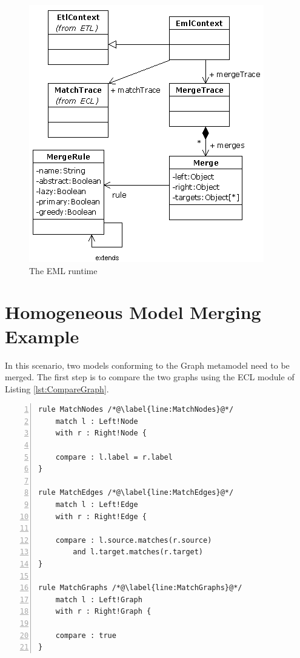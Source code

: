 \begin{figure}
	\centering
		\includegraphics{images/EmlRuntime.png}
	\caption{The EML runtime}
	\label{fig:EmlRuntime}
\end{figure}

\section{Homogeneous Model Merging Example}

In this scenario, two models conforming to the Graph metamodel need to be merged. The first step is to compare the two graphs using the ECL module of Listing \ref{lst:CompareGraph}.

\begin{lstlisting}[basicstyle=\ttfamily\footnotesize, flexiblecolumns=true, numbers=left, nolol=true, caption=ECL module for comparing two instances of the Graph metamodel, label=lst:CompareGraph, language=ECL, tabsize=2]
rule MatchNodes /*@\label{line:MatchNodes}@*/
	match l : Left!Node
	with r : Right!Node {

	compare : l.label = r.label
}

rule MatchEdges /*@\label{line:MatchEdges}@*/
	match l : Left!Edge
	with r : Right!Edge {

	compare : l.source.matches(r.source)
		and l.target.matches(r.target)
}

rule MatchGraphs /*@\label{line:MatchGraphs}@*/
	match l : Left!Graph
	with r : Right!Graph {

	compare : true
}
\end{lstlisting}

